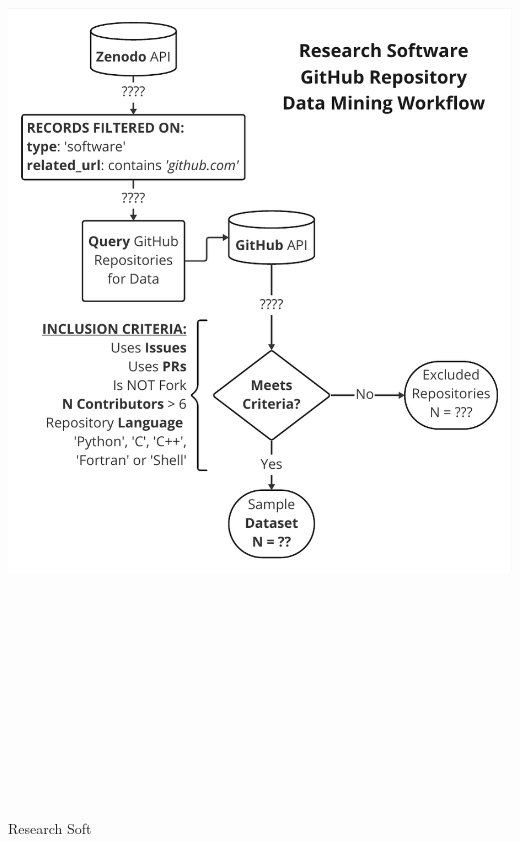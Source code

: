 \documentclass[25pt, a0paper, landscape, margin=10mm, innermargin=15mm, blockverticalspace=10mm, subcolspace=7mm, dvipsnames]{tikzposter} %
\begin{document}
\begin{columns}
{\begin{multicols}{2}
{        %





        
        \begin{tikzfigure}
            \includegraphics[height=270mm]{Figures/epccposter - DataMiningWorkflow.pdf}
        \end{tikzfigure}

        Research Soft}
\end{multicols}}
\end{columns}
\end{document}
